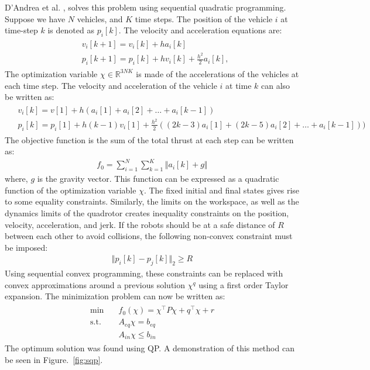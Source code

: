 D’Andrea et al. \cite{augugliaro2012generation}, solves this problem using sequential quadratic programming. Suppose we have $N$ vehicles, and $K$ time steps. The position of the vehicle $i$ at time-step $k$ is denoted as $p_i[k]$. The velocity and acceleration equations are:
\begin{align}
\begin{split}
&v_i[k+1]=v_i[k]+ha_i[k]\\
&p_i[k+1]=p_i[k] + hv_i[k] + \frac{h^2}{2}a_i[k],
\end{split}
\end{align}
The optimization variable $\chi\in \mathbb{R}^{3NK}$ is made of the accelerations of the vehicles at each time step. The velocity and acceleration of the vehicle $i$ at time $k$ can also be written as:
\begin{align}
\begin{split}
&v_i[k]=v[1] + h(a_i[1] + a_i[2] +\ldots+a_i[k-1])\\
&p_i[k]=p_i[1] + h(k-1)v_i[1] + \frac{h^2}{2}\left((2k-3)a_i[1] + (2k-5)a_i[2]+\ldots+a_i[k-1]\right))
\end{split}
\end{align}
The objective function is the sum of the total thrust at each step can be written as:
\begin{align}
f_0=\sum_{i=1}^N\sum_{k=1}^K\left\Vert a_i[k]+g\right\Vert
\end{align}
where, $g$ is the gravity vector. This function can be expressed as a quadratic function of the optimization variable $\chi$. The fixed initial and final states gives rise to some equality constraints. Similarly, the limits on the workspace, as well as the dynamics limits of the quadrotor creates inequality constraints on the position, velocity, acceleration, and jerk. If the robots should be at a safe distance of $R$ between each other to avoid collisions, the following non-convex constraint must be imposed:
\begin{align}
\Vert p_i[k]-p_j[k]\Vert_2 \geq R
\end{align} 
Using sequential convex programming, these constraints can be replaced with convex approximations around a previous solution $\chi^q$ using a first order Taylor expansion. The minimization problem can now be written as:
\begin{align}
\begin{split}
\min \quad &f_0(\chi) = \chi^\top P\chi + q^\top \chi + r \\
\text{s.t.} \quad &A_{eq}\chi=b_{eq}\\&A_{in}\chi\leq b_{in}
\end{split}
\end{align}
The optimum solution was found using QP. A demonstration of this method can be seen in Figure.~\ref{fig:sqp}.

